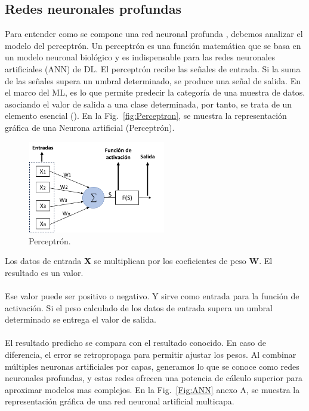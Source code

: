 \documentclass[11pt,a4paper,openany]{article}
\begin{document}
    \subsection{Redes neuronales profundas}

    Para entender como se compone una red neuronal profunda , debemos analizar el modelo del perceptrón. Un perceptrón es una función matemática que se basa en un modelo neuronal biológico y es indispensable para las redes neuronales artificiales (ANN) de DL. El perceptrón recibe las señales de entrada. Si la suma de las señales supera un umbral determinado, se produce una señal de salida. En el marco del ML, es lo que permite predecir la categoría de una muestra de datos. asociando el valor de salida a una clase determinada, por tanto, se trata de un elemento esencial (\cite{P_ADELI_1989}). En la Fig.~\ref{fig:Perceptron}, se muestra la representación gráfica de una Neurona artificial (Perceptrón).

    \begin{figure}[h]
            \centering
            \includegraphics[width=6cm]{Perceptron.png}
            \caption {Perceptrón. \label{fig:perceptron}}
        \end{figure}

    Los datos de entrada \textbf{X} se multiplican por los coeficientes de peso \textbf{W}. El resultado es un valor.\\
    \\
    Ese valor puede ser positivo o negativo. Y sirve como entrada para la función de activación. Si el peso calculado de los datos de entrada supera un umbral determinado se entrega el valor de salida. \\
    \\
    El resultado predicho se compara con el resultado conocido. En caso de diferencia, el error se retropropaga para permitir ajustar los pesos. Al combinar múltiples neuronas artificiales por capas, generamos lo que se conoce como redes neuronales profundas, y estas redes ofrecen una potencia de cálculo superior para aproximar modelos mas complejos. En la Fig.~\ref{Fig:ANN} anexo A, se muestra la representación gráfica de una red neuronal artificial multicapa.\\
\end{document}
